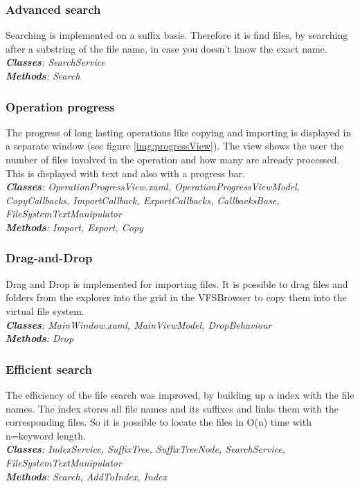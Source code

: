 \documentclass[JCDReport.tex]{subfiles}
\begin{document}
\subsubsection{Advanced search}
Searching is implemented on a suffix basis. Therefore it is find files, by searching after a substring of the file name, in case you doesn't know the exact name.\\
\textit{\textbf{Classes}: SearchService \\
\textbf{Methods}: Search}

\subsubsection{Operation progress}
The progress of long lasting operations like copying and importing is displayed in a separate window (see figure \ref{img:progressView}). The view shows the user the number of files involved in the operation and how many are already processed. This is displayed with text and also with a progress bar.\\
\textit{\textbf{Classes}: OperationProgressView.xaml, OperationProgressViewModel, CopyCallbacks, ImportCallback, ExportCallbacks, CallbacksBase, FileSystemTextManipulator\\
\textbf{Methods}: Import, Export, Copy}


\subsubsection{Drag-and-Drop}
Drag and Drop is implemented for importing files. It is possible to drag files and folders from the explorer into the grid in the VFSBrowser to copy them into the virtual file system.\\
\textit{\textbf{Classes}: MainWindow.xaml, MainViewModel, DropBehaviour \\
\textbf{Methods}: Drop}

\subsubsection{Efficient search}
The efficiency of the file search was improved, by building up a index with the file names. The index stores all file names and its suffixes and links them with the corresponding files. So it is possible to locate the files in O(n) time with n=keyword length.\\
\textit{\textbf{Classes}: IndexService, SuffixTree, SuffixTreeNode, SearchService, FileSystemTextManipulator\\
\textbf{Methods}: Search, AddToIndex, Index}
\end{document}
